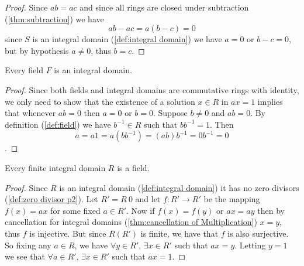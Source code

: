 \documentclass[../main.tex]{subfiles}
\begin{document}
\begin{proof}
Since $ab=ac$ and since all rings are closed under subtraction (\ref{thm:subtraction}) we have \[
ab - ac = a(b-c) = 0
\]
since $S$ is an integral domain (\ref{def:integral domain}) we have $a=0$ or $b-c = 0$, but by hypothesis $a \neq 0$, thus $b=c$.
\end{proof}

\begin{theorem}\label{thm:fields are integral domains}
Every field $F$ is an integral domain.
\end{theorem}


\begin{proof}
Since both fields and integral domains are commutative rings with identity,
we only need to show that the existence of a solution $x \in R$ in $ax=1$ implies
that whenever $ab=0$ then $a=0$ or $b=0$. Suppose $b\neq 0$ and $ab=0$. By definition
(\ref{def:field}) we have $b^{-1} \in R$ such that $bb^{-1} = 1$. Then
\[
a = a1 = a(bb^{-1}) = (ab)b^{-1} = 0b^{-1} = 0
\].
\end{proof}












\begin{theorem}\label{thm:finite integral domain is field}
Every finite integral domain $R$ is a field.
\end{theorem}

\begin{proof}
Since $R$ is an integral domain (\ref{def:integral domain}) it has no zero divisors (\ref{def:zero divisor p2}).
Let $R' = R \ {0}$ and let $f: R' \to R'$ be the mapping $f(x) = ax$ for some fixed
$a \in R'$. Now if $f(x) = f(y)$ or $ax = ay$ then by cancellation for integral domains (\ref{thm:cancellation of Multiplication}) $x=y$,
thus $f$ is injective. But since $R (R')$ is finite, we have that $f$ is also surjective.
So fixing any $a \in R$, we have $\forall y \in R'$, $\exists x \in R'$ such that
$ax = y$. Letting $y = 1$ we see that $\forall a \in R'$, $\exists x \in R'$ such that $ax = 1$. 
\end{proof}
\end{document}
